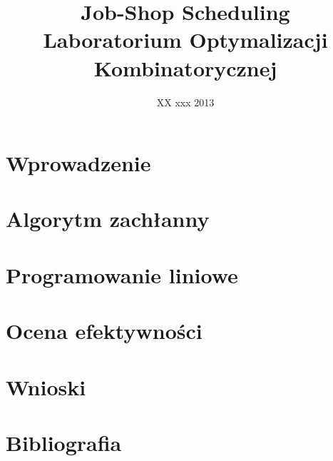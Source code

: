 \documentclass[10pt,a4paper]{article}
\author{\authorthing}
\date{XX xxx 2013}
\title{Job-Shop Scheduling\\Laboratorium Optymalizacji Kombinatorycznej}
\begin{document}
\maketitle
\section{Wprowadzenie}
\section{Algorytm zachłanny}
\section{Programowanie liniowe}
\section{Ocena efektywności}
\section{Wnioski}
\section{Bibliografia}
\end{document}
